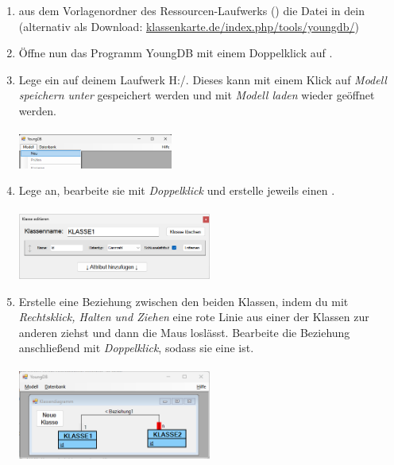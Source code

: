 
\begin{enumerate}
    \item {} aus dem Vorlagenordner des Ressourcen-Laufwerks () die Datei  in dein   (alternativ als Download: \url{klassenkarte.de/index.php/tools/youngdb/})
    \item Öffne nun das Programm YoungDB mit einem Doppelklick auf .
    \item Lege ein  auf deinem Laufwerk H:/. Dieses kann mit einem Klick auf \emph{Modell speichern unter} gespeichert werden und mit \emph{Modell laden} wieder geöffnet werden.\\\\
    \includegraphics[width=0.4\textwidth]{img/YDB_ModellNeu.png}
    \item Lege  an, bearbeite sie mit \emph{Doppelklick} und erstelle jeweils einen .\\\\
    \includegraphics[width=0.5\textwidth]{img/YDB_idErstellen.png}
    \item Erstelle eine Beziehung zwischen den beiden Klassen, indem du mit \emph{Rechtsklick, Halten und Ziehen} eine rote Linie aus einer der Klassen zur anderen ziehst und dann die Maus loslässt. Bearbeite die Beziehung anschließend mit \emph{Doppelklick}, sodass sie eine  ist.\\\\
    \includegraphics[width=0.5\textwidth]{img/YDB_1nBeziehung.png}\\

\end{enumerate}
